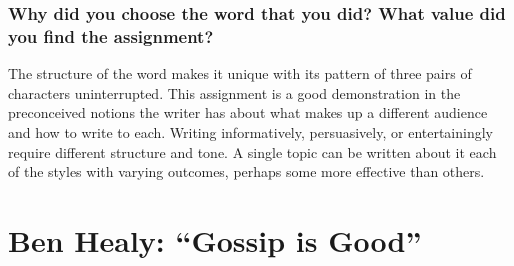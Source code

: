 \documentclass[12pt]{article}
\begin{document}
\subsubsection{Why did you choose the word that you did? What value did you find the assignment?}

The structure of the word makes it unique with its pattern of three pairs of characters uninterrupted.
This assignment is a good demonstration in the preconceived notions the writer has about what makes up a different audience and how to write to each.
Writing informatively, persuasively, or entertainingly require different structure and tone.
A single topic can be written about it each of the styles with varying outcomes, perhaps some more effective than others.


\section{Ben Healy: ``Gossip is Good''}
\end{document}
